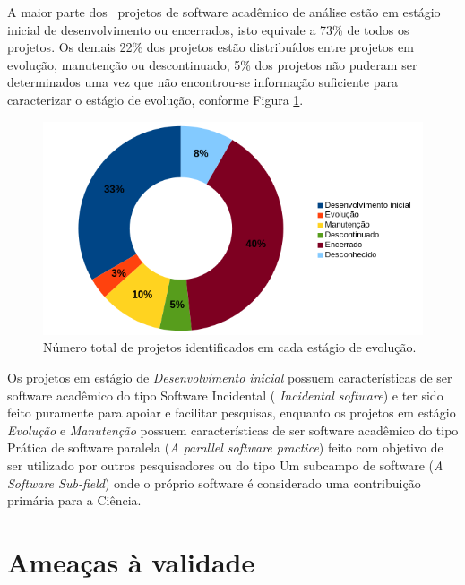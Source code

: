 A maior parte dos \SoftwareCount \ projetos de software acadêmico de análise estão
em estágio inicial de desenvolvimento ou encerrados, isto equivale a
73\% de todos os projetos. Os demais 22\% dos projetos estão distribuídos entre
projetos em evolução, manutenção ou descontinuado, 5\% dos projetos não puderam
ser determinados uma vez que não encontrou-se informação suficiente para
caracterizar o estágio de evolução,
conforme Figura \ref{life-cycle}.

\begin{figure}[h]
  \begin{minipage}{0.5\textwidth}
    \centering
    \includegraphics[scale=0.55]{imagens/life-cycle-pie.png}
  \end{minipage}
  \begin{minipage}{0.5\textwidth}
    \centering
    
  \end{minipage}
  \caption{Número total de projetos identificados em cada estágio de evolução.}
  \label{life-cycle}
\end{figure}

Os projetos em estágio de {\it Desenvolvimento inicial} possuem
características de ser software acadêmico do tipo Software Incidental ({\it
Incidental software}) e ter sido feito puramente para apoiar e facilitar
pesquisas, enquanto os projetos em estágio {\it Evolução} e {\it Manutenção}
possuem características de ser software acadêmico do tipo Prática de software
paralela ({\it A parallel software practice}) feito com objetivo de ser
utilizado por outros pesquisadores ou do tipo Um subcampo de software ({\it A Software
Sub-field}) onde o próprio software é considerado uma contribuição primária
para a Ciência.


\section{Ameaças à validade} %

